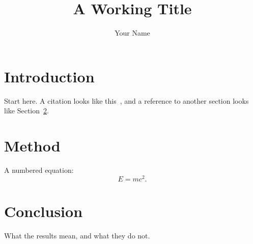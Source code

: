 \documentclass[unnumsec,webpdf,contemporary,large]{oup-authoring-template}
\begin{document}


\title[A Working Title]{A Working Title}

\author[1]{Your Name}
\address[1]{, }


\maketitle

\section{Introduction}
\label{sec:introduction}

Start here.  A citation looks like this~\cite{knuth1984}, and a reference to
another section looks like Section~\ref{sec:method}.

\section{Method}
\label{sec:method}

A numbered equation:
\begin{equation}
  \label{eq:example}
  E = mc^2.
\end{equation}

\section{Conclusion}

What the results mean, and what they do not.



\end{document}
